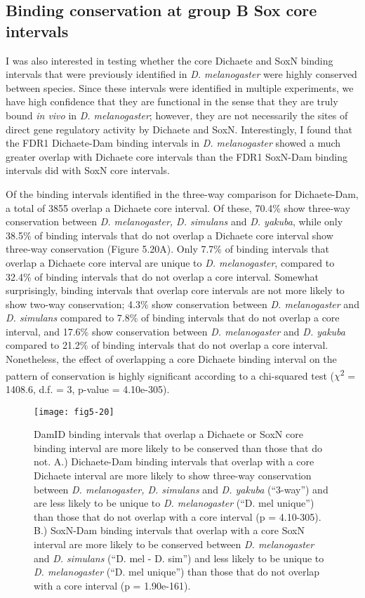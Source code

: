 \subsection{Binding conservation at group B Sox core intervals}
I was also interested in testing whether the core Dichaete and SoxN binding intervals that were previously identified in \emph{D. melanogaster} were highly conserved between species. Since these intervals were identified in multiple experiments, we have high confidence that they are functional in the sense that they are truly bound \emph{in vivo} in \emph{D. melanogaster}; however, they are not necessarily the sites of direct gene regulatory activity by Dichaete and SoxN. Interestingly, I found that the FDR1 Dichaete-Dam binding intervals in \emph{D. melanogaster} showed a much greater overlap with Dichaete core intervals than the FDR1 SoxN-Dam binding intervals did with SoxN core intervals.

Of the binding intervals identified in the three-way comparison for Dichaete-Dam, a total of 3855 overlap a Dichaete core interval. Of these, 70.4\% show three-way conservation between \emph{D. melanogaster, D. simulans} and \emph{D. yakuba}, while only 38.5\% of binding intervals that do not overlap a Dichaete core interval show three-way conservation (Figure 5.20A). Only 7.7\% of binding intervals that overlap a Dichaete core interval are unique to \emph{D. melanogaster}, compared to 32.4\% of binding intervals that do not overlap a core interval. Somewhat surprisingly, binding intervals that overlap core intervals are not more likely to show two-way conservation; 4.3\% show conservation between \emph{D. melanogaster} and \emph{D. simulans} compared to 7.8\% of binding intervals that do not overlap a core interval, and 17.6\% show conservation between \emph{D. melanogaster} and \emph{D. yakuba} compared to 21.2\% of binding intervals that do not overlap a core interval. Nonetheless, the effect of overlapping a core Dichaete binding interval on the pattern of conservation is highly significant according to a chi-squared test (\(\chi\)\textsuperscript{2} = 1408.6, d.f. = 3, p-value = 4.10e-305).

\begin{figure}
\centering
\texttt{[image: fig5-20]}
\caption[DamID binding intervals that overlap a Dichaete or SoxN core binding interval are more likely to be conserved than those that do not]{DamID binding intervals that overlap a Dichaete or SoxN core binding interval are more likely to be conserved than those that do not. A.) Dichaete-Dam binding intervals that overlap with a core Dichaete interval are more likely to show three-way conservation between \emph{D. melanogaster, D. simulans} and \emph{D. yakuba} (“3-way”) and are less likely to be unique to \emph{D. melanogaster}  (“D. mel unique”) than those that do not overlap with a core interval (p = 4.10-305). B.) SoxN-Dam binding intervals that overlap with a core SoxN interval are more likely to be conserved between \emph{D. melanogaster} and \emph{D. simulans} (“D. mel - D. sim”) and less likely to be unique to \emph{D. melanogaster} (“D. mel unique”) than those that do not overlap with a core interval (p = 1.90e-161).}
\label{Figure 5.20}
\end{figure}


